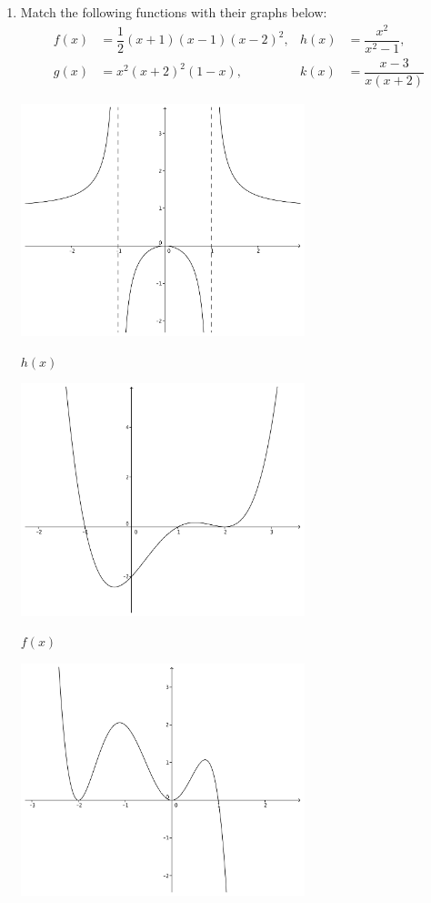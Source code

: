 \documentclass[12pt]{article}
\newcommand{\points}[1]{\marginpar{\hspace{24pt}[#1]}}
\begin{document}
\begin{enumerate}
\item Match the following functions with their graphs below: \points{8}
\begin{align*}
 f(x) &= \dfrac{1}{2}(x+1)(x-1)(x-2)^2, &h(x) &= \dfrac{x^2}{x^2-1},\\
 g(x) &= x^2(x+2)^2(1-x), &k(x) &= \dfrac{x-3}{x(x+2)}
\end{align*}

\bigskip

\begin{multicols}{2}
 \begin{center}
  \includegraphics[width=3.25in]{rat1(b)}

$h(x)$
 \end{center}

\bigskip

\bigskip

 \begin{center}
   \includegraphics[width=3.25in]{poly1(a)}

$f(x)$
 \end{center}
 \begin{center}
   \includegraphics[width=3.25in]{poly1(c)}


\end{center}
\end{multicols}
\end{enumerate}
\end{document}
